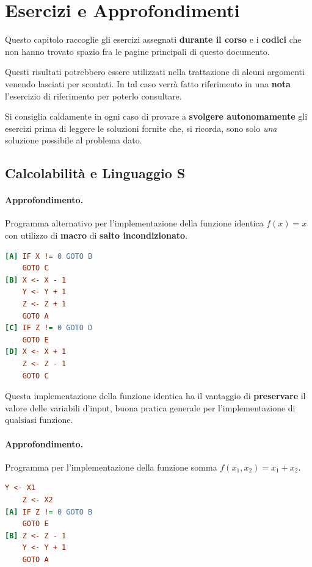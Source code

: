\chapter{Esercizi e Approfondimenti}

Questo capitolo raccoglie gli esercizi assegnati \textbf{durante il corso} e i \textbf{codici} che non hanno trovato spazio fra le pagine principali di questo documento.

Questi risultati potrebbero essere utilizzati nella trattazione di alcuni argomenti venendo lasciati per scontati. In tal caso verrà fatto riferimento
in una \textbf{nota} l'esercizio di riferimento per poterlo consultare.

Si consiglia caldamente in ogni caso di provare a \textbf{svolgere autonomamente} gli esercizi prima di leggere le soluzioni fornite che, si ricorda, sono solo \textit{una} soluzione possibile al problema dato.

\section{Calcolabilità e Linguaggio S}

\subsubsection*{Approfondimento.} Programma alternativo per l'implementazione della funzione identica \(f(x)=x\) con utilizzo di \textbf{macro} di \textbf{salto incondizionato}.

\begin{lstlisting}[language=ini, label={Funzione Identica AltVer},  caption=Funzione identica]
[A] IF X != 0 GOTO B
    GOTO C
[B] X <- X - 1
    Y <- Y + 1
    Z <- Z + 1
    GOTO A
[C] IF Z != 0 GOTO D
    GOTO E
[D] X <- X + 1
    Z <- Z - 1
    GOTO C
\end{lstlisting}

Questa implementazione della funzione identica ha il vantaggio di \textbf{preservare} il valore delle variabili d'input, buona pratica generale per l'implementazione di qualsiasi funzione.

\subsubsection*{Approfondimento.} Programma per l'implementazione della funzione somma \(f(x_1,x_2)=x_1+x_2\).

\begin{lstlisting}[language=ini, label={Funzione Somma},  caption=Funzione somma]
    Y <- X1
    Z <- X2
[A] IF Z != 0 GOTO B
    GOTO E
[B] Z <- Z - 1
    Y <- Y + 1
    GOTO A
\end{lstlisting}

